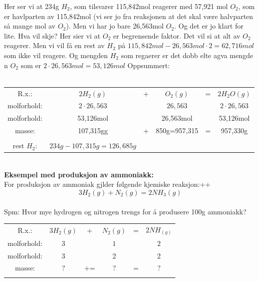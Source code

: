 \documentclass[12pt,a4paper]{article}
\begin{document}
Her ser vi at 234g $H_2$, som tilsvarer 115,842mol reagerer med 57,921 mol $O_2$, som er havlparten av 115,842mol (vi ser jo fra reaksjonen at det skal være halvparten så mange mol av $O_2$). Men vi har jo bare  26,563mol $O_2$.  Og det er jo klart for lite.  Hva vil skje?  Her sier vi at $O_2$ er begrensende faktor.  Det vil si at alt av $O_2$ reagerer. Men vi vil få en rest av $H_2$ på $115,842mol-26,563mol\cdot 2=62,716mol$ som ikke vil reagere.  Og mengden $H_2$ som regaerer er det dobb elte agva mengde n $O_2$ som er $2\cdot 26,563mol=53,126mol$ Oppsummert:\\\\
\begin{table}[h!]
    \centering
    \begin{tabular}{cccccc}
         R.x.:&  $2H_2(g)$&  +&  $O_2(g)$&  =& $2H_2O(g)$\\
         molforhold:&$2\cdot 26,563$&  & $26,563$&  &$2\cdot 26,563$\\
         molforhold:&53,126mol& &26,563mol&&53,126mol\\
         masse:&107,315gg&+&850g=957,315&=&957,330g\\\\ 
         rest $H_2$:&$234g-107,315g=126,685g$& \\
    \end{tabular}
\end{table}\\
\textbf{Eksempel med produksjon av ammoniakk:} \\
For produksjon av ammoniak gjlder følgende kjemiske reaksjon:++
$$3H_2(g)+N_2(g)=2NH_3(g)$$\\
Spm: Hvor mye hydrogen og nitrogen trengs for å produsere 100g ammoniakk?\newpage
\begin{table}[h!]
    \centering
    \begin{tabular}{cccccc}
         R.x.:&  $3H_2(g)$&  +&  $N_2(g)$&  =& $2NH_(g)$\\
         molforhold:&$3$&  & $1$&  &$2$\\
         molforhold:&3 & &2&&2\\
         masse:&?&+=&?&=&?\\\\ 
    \end{tabular}
\end{table}
 
\end{document}
